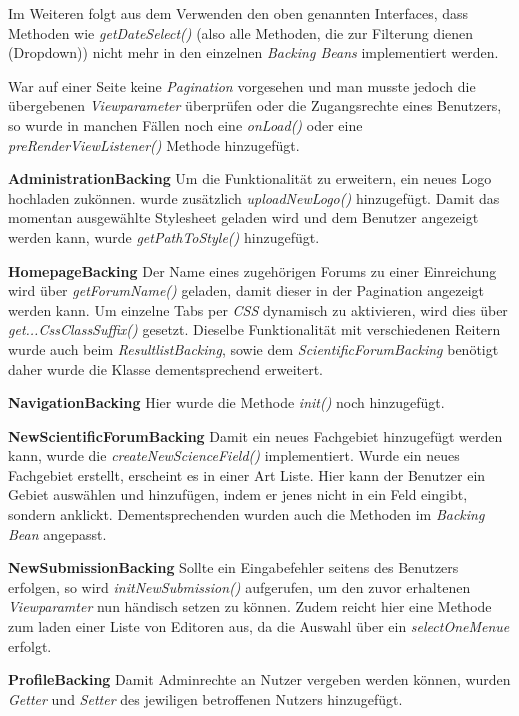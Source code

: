 Im Weiteren folgt aus dem Verwenden den oben genannten Interfaces, dass Methoden wie \emph{getDateSelect()} (also alle Methoden, die zur Filterung dienen (Dropdown)) nicht mehr in den einzelnen \emph{Backing Beans} implementiert werden.

War auf einer Seite keine \emph{Pagination} vorgesehen und man musste jedoch die übergebenen \emph{Viewparameter} überprüfen oder die Zugangsrechte eines Benutzers, so wurde in manchen Fällen noch eine \emph{onLoad()} oder eine \emph{preRenderViewListener()} Methode hinzugefügt.

\textbf{AdministrationBacking} Um die Funktionalität zu erweitern, ein neues Logo hochladen zukönnen. wurde zusätzlich \emph{uploadNewLogo()} hinzugefügt. \newline
Damit das momentan ausgewählte Stylesheet geladen wird und dem Benutzer angezeigt werden kann, wurde \emph{getPathToStyle()} hinzugefügt.

\textbf{HomepageBacking} Der Name eines zugehörigen Forums zu einer Einreichung wird über \emph{getForumName()} geladen, damit dieser in der Pagination angezeigt werden kann. \newline
Um einzelne Tabs per \emph{CSS} dynamisch zu aktivieren, wird dies über \emph{get...CssClassSuffix()} gesetzt. Dieselbe Funktionalität mit verschiedenen Reitern wurde auch beim \emph{ResultlistBacking}, sowie dem \emph{ScientificForumBacking} benötigt daher wurde die Klasse dementsprechend erweitert.

\textbf{NavigationBacking} Hier wurde die Methode \emph{init()} noch hinzugefügt.

\textbf{NewScientificForumBacking} Damit ein neues Fachgebiet hinzugefügt werden kann, wurde die \emph{createNewScienceField()} implementiert. Wurde ein neues Fachgebiet erstellt, erscheint es in einer Art Liste. Hier kann der Benutzer ein Gebiet auswählen und hinzufügen, indem er jenes nicht in ein Feld eingibt, sondern anklickt. Dementsprechenden wurden auch die Methoden im \emph{Backing Bean} angepasst.

\textbf{NewSubmissionBacking} Sollte ein Eingabefehler seitens des Benutzers erfolgen, so  wird \emph{initNewSubmission()} aufgerufen, um den zuvor erhaltenen \emph{Viewparamter} nun händisch setzen zu können.\newline
Zudem reicht hier eine Methode zum laden einer Liste von Editoren aus, da die Auswahl über ein \emph{selectOneMenue} erfolgt.

\textbf{ProfileBacking} Damit Adminrechte an Nutzer vergeben werden können, wurden \emph{Getter} und \emph{Setter} des jewiligen betroffenen Nutzers hinzugefügt.

